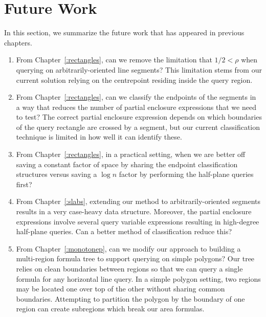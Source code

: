 \section{Future Work}
\label{:conclusion:open-problems}

In this section, we summarize the future work that has appeared in previous chapters.

\begin{enumerate}
\item From Chapter~\ref{:rectangles}, can we remove the limitation that $1/2 < \rho$ when querying on arbitrarily-oriented line segments?  
This limitation stems from our current solution relying on the centrepoint residing inside the query region.

\item From Chapter~\ref{:rectangles}, can we classify the endpoints of the segments in a way that reduces the number of partial enclosure expressions that we need to test?
The correct partial enclosure expression depends on which boundaries of the query rectangle are crossed by a segment, but our current classification technique is limited in how well it can identify these.

\item From Chapter~\ref{:rectangles}, in a practical setting, when we are better off saving a constant factor of space by sharing the endpoint classification structures versus saving a $\log{n}$ factor by performing the half-plane queries first?

\item From Chapter~\ref{:slabs}, extending our method to arbitrarily-oriented segments results in a very case-heavy data structure. 
Moreover, the partial enclosure expressions involve several query variable expressions resulting in high-degree half-plane queries. 
Can a better method of classification reduce this?

\item From Chapter~\ref{:monotonep}, can we modify our approach to building a multi-region formula tree to support querying on simple polygons?  Our tree relies on clean boundaries between regions so that we can query a single formula for any horizontal line query. In a simple polygon setting, two regions may be located one over top of the other without sharing common boundaries.  Attempting to partition the polygon by the boundary of one region can create subregions which break our area formulas.

\end{enumerate}
